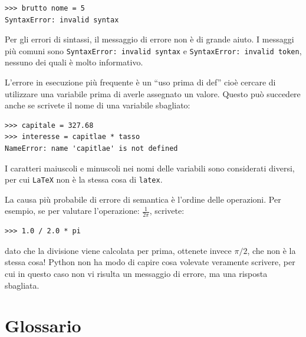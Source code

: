 \documentclass[10pt]{book}
\begin{document}
\begin{verbatim}
>>> brutto nome = 5
SyntaxError: invalid syntax
\end{verbatim}
%
Per gli errori di sintassi, il messaggio di errore non è di grande aiuto. I messaggi più comuni sono {\tt SyntaxError: invalid syntax} e
{\tt SyntaxError: invalid token}, nessuno dei quali è molto informativo.

L'errore in esecuzione più frequente è un ``uso prima di def'' cioè cercare di utilizzare una variabile prima di averle assegnato un valore. Questo può succedere anche se scrivete il nome di una variabile sbagliato: 

\begin{verbatim}
>>> capitale = 327.68
>>> interesse = capitlae * tasso
NameError: name 'capitlae' is not defined
\end{verbatim}
%
I caratteri maiuscoli e minuscoli nei nomi delle variabili sono considerati diversi, per cui {\tt LaTeX} non è la stessa cosa di {\tt latex}.

La causa più probabile di errore di semantica è l'ordine delle operazioni. Per esempio, se per valutare l'operazione:
 $\frac{1}{2 \pi}$,
scrivete:

\begin{verbatim}
>>> 1.0 / 2.0 * pi
\end{verbatim}
%
dato che la divisione viene calcolata per prima, ottenete invece $\pi / 2$, che non è la stessa cosa! Python non ha modo di capire cosa volevate veramente scrivere, per cui in questo caso non vi risulta un messaggio di errore, ma una risposta sbagliata.


\section{Glossario}
\end{document}
